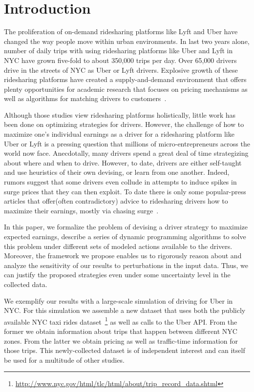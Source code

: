 
\section{Introduction}
\label{sec:introduction}

The proliferation of on-demand ridesharing platforms like Lyft and Uber
have changed the way people move within urban environments. 
In last two years alone, number of daily trips with using ridesharing platforms like 
Uber and Lyft in NYC have grown five-fold to about 350,000 trips per day. Over 65,000 drivers drive in the streets of NYC as Uber or Lyft drivers.
Explosive growth of these ridesharing platforms have created a supply-and-demand environment that offers 
plenty opportunities for academic research that focuses on pricing mechanisms
as well as algorithms for matching drivers to 
customers~\cite{banerjee2015pricing,ozkan2016dynamic}.


Although those studies view ridesharing platforms holistically, little work
has been done on optimizing strategies for drivers. 
However, the challenge of how to maximize one's individual earnings as a driver for a 
ridesharing platform like Uber or Lyft is a pressing question that millions of micro-entrepreneurs 
across the world now face.  Anecdotally, many drivers spend a great deal of time 
strategizing about where and when to drive.  However, to date, drivers are either
self-taught and use heuristics of their own devising, or learn from one another.
Indeed, rumors suggest that some drivers even collude in attempts to induce spikes in surge prices that they can then exploit.
To date there is only  some 
popular-press articles that offer(often contradictory) advice to ridesharing drivers how to maximize their earnings, mostly via chasing surge~\cite{dont,tips}. 

 In this paper, we formalize the problem of devising a driver strategy to maximize expected 
 earnings, describe a series of dynamic programming algorithms to solve this problem
 under different sets of modeled actions available to the drivers. 
 Moreover, the framework we propose enables us to rigorously reason about  and analyze the sensitivity of our results to perturbations in the input data. 
 Thus, we can justify the proposed strategies even under some uncertainty level in the
 collected data. 
  
We exemplify our  results with a large-scale simulation of driving for Uber in NYC. For this simulation we assemble a new dataset that uses both the publicly available NYC taxi rides 
dataset~\footnote{\url{http://www.nyc.gov/html/tlc/html/about/trip_record_data.shtml}} as well as calls to the Uber API. From the former we obtain information about trips that happen between different NYC zones. From the latter we obtain pricing as well as traffic-time information for those trips. This newly-collected dataset is of independent interest and can itself be used for a multitude of other studies.


